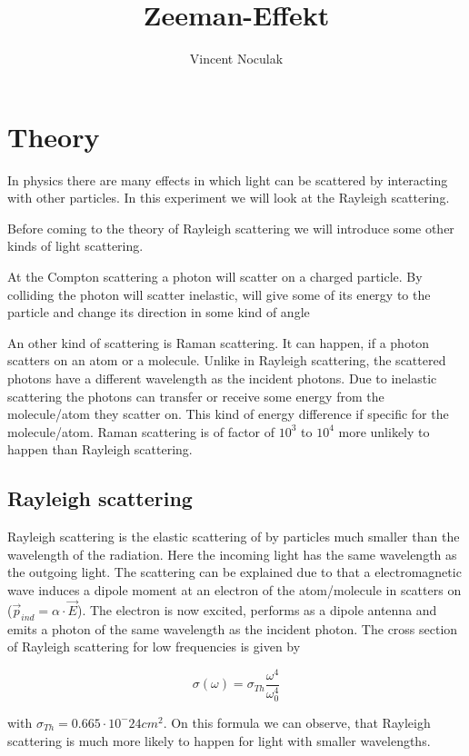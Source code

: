 \documentclass[12pt,a4paper]{article}
\author{Vincent Noculak}
\title{Zeeman-Effekt}
\begin{document}
\newpage

\section{Theory}

In physics there are many effects in which light can be scattered by interacting with other particles. In this experiment we will look at the Rayleigh scattering.

Before coming to the theory of Rayleigh scattering we will introduce some other kinds of light scattering.

At the Compton scattering a photon will scatter on a charged particle. By colliding the photon will scatter inelastic, will give some of its energy to the particle and change its direction in some kind of angle

An other kind of scattering is Raman scattering. It can happen, if a photon scatters on an atom or a molecule. Unlike in Rayleigh scattering, the scattered photons have a different wavelength as the incident photons. Due to inelastic scattering the photons can transfer or receive some energy from the molecule/atom they scatter on. This kind of energy difference if specific for the molecule/atom. Raman scattering is of factor of $10^3$ to $10^4$ more unlikely to happen than Rayleigh scattering.

\subsection{Rayleigh scattering}

Rayleigh scattering is the elastic scattering of by particles much smaller than the wavelength of the radiation. Here the incoming light has the same wavelength as the outgoing light.
The scattering can be explained due to that a electromagnetic wave induces a dipole moment at an electron of the atom/molecule in scatters on ($\vec{p}_{ind} = \alpha \cdot \vec{E}$). The electron is now excited, performs as a dipole antenna and emits a photon of the same wavelength as the incident photon.
The cross section of Rayleigh scattering for low frequencies is given by

\begin{equation}
\sigma(\omega) = \sigma_{Th} \frac{\omega^4}{\omega_0^4}
\end{equation}

with $\sigma_{Th} = 0.665 \cdot 10^-24 cm^2$. On this formula we can observe, that Rayleigh scattering is much more likely to happen for light with smaller wavelengths.
\end{document}
